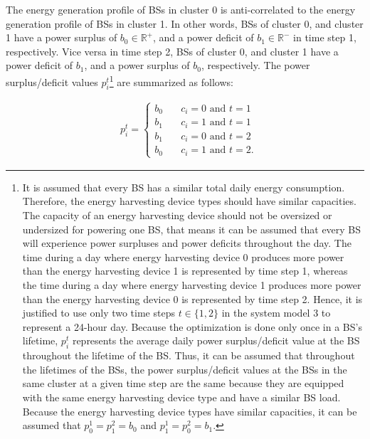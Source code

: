 The energy generation profile of BSs in cluster 0 is anti-correlated to the energy generation profile of BSs in cluster 1. In other words, BSs of cluster 0, and cluster 1 have a power surplus of $b_0\in \mathbb{R^+}$, and a power deficit of $b_1\in \mathbb{R^-}$ in time step 1, respectively. Vice versa in time step 2, BSs of cluster 0, and cluster 1 have a power deficit of $b_1$, and a power surplus of $b_0$, respectively. The power surplus/deficit values $p^t_i$\footnote{It is assumed that every BS has a similar total daily energy consumption. Therefore, the energy harvesting device types should have similar capacities. The capacity of an energy harvesting device should not be oversized or undersized for powering one BS, that means it can be assumed that every BS will experience power surpluses and power deficits throughout the day.  
The time during a day where energy harvesting device 0 produces more power than the energy harvesting device 1 is represented by time step 1, whereas the time during a day where energy harvesting device 1 produces more power than the energy harvesting device 0 is represented by time step 2. Hence, it is justified to use only two time steps $t\in\{1,2\}$ in the system model 3 to represent a 24-hour day. Because the optimization is done only once in a BS's lifetime, $p^t_i$ represents the average daily power surplus/deficit value at the BS throughout the lifetime of the BS. Thus, it can be assumed that throughout the lifetimes of the BSs, the power surplus/deficit values at the BSs in the same cluster at a given time step are the same because they are equipped with the same energy harvesting device type and have a similar BS load. 
Because the energy harvesting device types have similar capacities, it can be assumed that $p^1_0=p^2_1=b_0$ and $p^1_1=p^2_0=b_1$.} are summarized as follows:


\begin{equation}\label{p_values}
\begin{aligned}
&p^t_i=\begin{cases} 
			b_0& \quad  c_i=0 \text{ and }t=1 \\
		b_1 &\quad  c_i=1 \text{ and }t=1\\
			b_1& \quad  c_i=0 \text{ and }t=2 \\
		b_0 &\quad  c_i=1 \text{ and }t=2.
   \end{cases}
	\end{aligned}
\end{equation}



